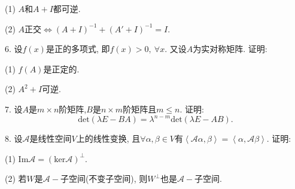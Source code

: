 \documentclass[12pt, a4paper, twoside]{ctexart}%
\begin{document}
	\hspace{1.2em}(1) $A$和$A+I$都可逆. \par
	\hspace{1.2em}(2) $A$正交$\iff (A+I)^{-1}+(A'+I)^{-1}=I$. \par 
	6. 设$f(x)$是正的多项式, 即$f(x)>0,\ \forall x$. 又设$A$为实对称矩阵. 证明: \par
	\hspace{1.2em}(1) $f(A)$是正定的.\par
	\hspace{1.2em}(2) $A^2+I$可逆.\par
	7. 设$A$是$m\times n$阶矩阵,$B$是$n\times m$阶矩阵且$m\leq n$. 
	证明: \[\mathrm{det}\left(\lambda E-BA\right)=\lambda^{n-m}\mathrm{det}\left(\lambda E-AB\right).\]\par 
	8. 设$\mathscr{A}$是线性空间$V$上的线性变换, 且$\forall \alpha,\beta\in V$有$\left<\mathscr{A}\alpha,\beta\right>=\left<\alpha,\mathscr{A}\beta\right>$. 证明: \par
	\hspace{1.2em}(1) $\mathrm{Im}\mathscr{A}=\left(\mathrm{ker}\mathscr{A}\right)^\perp$.\par
	\hspace{1.2em}(2) 若$W$是$\mathscr{A}-$子空间(不变子空间), 则$W^\perp$也是$\mathscr{A}-$子空间.\par

	\clearpage
\end{document}
